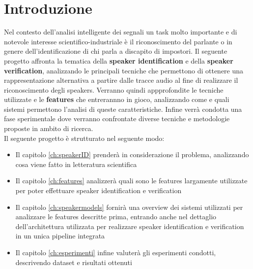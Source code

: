 \chapter{Introduzione}
Nel contesto dell'analisi intelligente dei segnali un task molto importante e di notevole interesse scientifico-industriale 
è il riconoscimento del parlante o in genere dell'identificazione di chi parla a discapito di impostori. Il seguente progetto affronta la tematica
della \textbf{speaker identification} e della \textbf{speaker verification}, analizzando le principali tecniche che permettono di ottenere
una rappresentazione alternativa a partire dalle tracce audio al fine di realizzare il riconoscimento degli speakers. 
Verranno quindi appprofondite le tecniche utilizzate e le \textbf{features} che entrerannno in gioco, analizzando come e quali sistemi permettono l'analisi di queste
caratteristiche. Infine verrà condotta una fase sperimentale dove verranno confrontate diverse tecniche e metodologie proposte in ambito di ricerca. \\
Il seguente progetto è strutturato nel seguente modo:
\begin{itemize}
    \item Il capitolo \ref{ch:speakerID} prenderà in considerazione il problema, analizzando cosa viene fatto in letteratura scientifica
    \item Il capitolo \ref{ch:features} analizzerà quali sono le features largamente utilizzate per poter effettuare speaker identification e verification 
    \item Il capitolo \ref{ch:speakermodels} fornirà una overview dei sistemi utilizzati per analizzare le features descritte prima, entrando anche nel dettaglio dell'architettura utilizzata
        per realizzare speaker identification e verification in un unica pipeline integrata
    \item Il capitolo \ref{ch:esperimenti} infine valuterà gli esperimenti condotti, descrivendo dataset e risultati ottenuti
\end{itemize}

